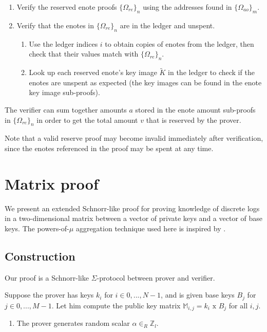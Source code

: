 \begin{appendices}
\begin{enumerate}
    \item Verify the reserved enote proofs $\{\Omega_{re}\}_n$ using the addresses found in $\{\Omega_{ao}\}_m$.

    \item Verify that the enotes in $\{\Omega_{re}\}_n$ are in the ledger and unspent.
    \begin{enumerate}
        \item Use the ledger indices $i$ to obtain copies of enotes from the ledger, then check that their values match with $\{\Omega_{re}\}_n$.
        \item Look up each reserved enote's key image $\tilde{K}$ in the ledger to check if the enotes are unspent as expected (the key images can be found in the enote key image sub-proofs).
    \end{enumerate}
\end{enumerate}

The verifier can sum together amounts $a$ stored in the enote amount sub-proofs in $\{\Omega_{re}\}_n$ in order to get the total amount $v$ that is reserved by the prover.

Note that a valid reserve proof may become invalid immediately after verification, since the enotes referenced in the proof may be spent at any time.



\section{Matrix proof}
\label{appendix:matrix-proof}

We present an extended Schnorr-like proof for proving knowledge of discrete logs in a two-dimensional matrix between a vector of private keys and a vector of base keys. The powers-of-$\mu$ aggregation technique used here is inspired by \cite{triptych-preprint}.


\subsection{Construction}
\label{appendix:matrix-proof-construction}

Our proof is a Schnorr-like $\Sigma$-protocol between prover and verifier.

Suppose the prover has keys $k_i$ for $i \in 0,..., N-1$, and is given base keys $B_j$ for $j \in 0,..., M-1$. Let him compute the public key matrix $\mathbb{M}_{i,j} = k_i \textrm{ x } B_j$ for all $i, j$.

\begin{enumerate}
    \item The prover generates random scalar $\alpha \in_R \mathbb{Z}_l$.


\end{enumerate}
\end{appendices}
